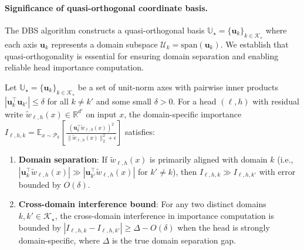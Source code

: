 \paragraph{Significance of quasi-orthogonal coordinate basis.}
The DBS algorithm constructs a quasi-orthogonal basis $\mathbb{U}_\star = \{\mathbf{u}_k\}_{k \in \mathcal{K}_\star}$ where each axis $\mathbf{u}_k$ represents a domain subspace $\mathcal{U}_k = \mathrm{span}(\mathbf{u}_k)$.
We establish that quasi-orthogonality is essential for ensuring domain separation and enabling reliable head importance computation.

\begin{theorem}
\label{thm:orthogonal_basis}
Let $\mathbb{U}_\star = \{\mathbf{u}_k\}_{k \in \mathcal{K}_\star}$ be a set of unit-norm axes with pairwise inner products $|\mathbf{u}_k^\top \mathbf{u}_{k'}| \leq \delta$ for all $k \neq k'$ and some small $\delta > 0$.
For a head $(\ell,h)$ with residual write $\tilde{w}_{\ell,h}(x) \in \mathbb{R}^{d'}$ on input $x$, the domain-specific importance $I_{\ell,h,k} = \mathbb{E}_{x \sim \mathcal{P}_k}[\frac{(\mathbf{u}_k^\top \tilde{w}_{\ell,h}(x))^2}{\|\tilde{w}_{\ell,h}(x)\|_2^2 + \epsilon}]$ satisfies:
\begin{enumerate}
    \item \textbf{Domain separation}: If $\tilde{w}_{\ell,h}(x)$ is primarily aligned with domain $k$ (i.e., $|\mathbf{u}_k^\top \tilde{w}_{\ell,h}(x)| \gg |\mathbf{u}_{k'}^\top \tilde{w}_{\ell,h}(x)|$ for $k' \neq k$), then $I_{\ell,h,k} \gg I_{\ell,h,k'}$ with error bounded by $O(\delta)$.
    \item \textbf{Cross-domain interference bound}: For any two distinct domains $k, k' \in \mathcal{K}_\star$, the cross-domain interference in importance computation is bounded by $|I_{\ell,h,k} - I_{\ell,h,k'}| \geq \Delta - O(\delta)$ when the head is strongly domain-specific, where $\Delta$ is the true domain separation gap.
\end{enumerate}
\end{theorem}

